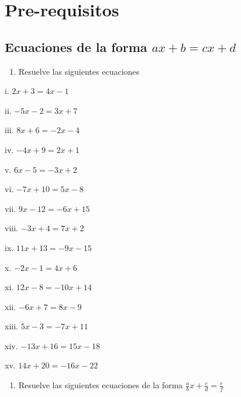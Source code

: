 \documentclass[]{book}
\providecommand{\tightlist}{%
  \setlength{\itemsep}{0pt}\setlength{\parskip}{0pt}}
\begin{document}
\chapter{Pre-requisitos}\label{pre-requisitos}

\section{\texorpdfstring{Ecuaciones de la forma
\(ax+b=cx+d\)}{Ecuaciones de la forma ax+b=cx+d}}\label{ecuaciones-de-la-forma-axbcxd}

\begin{enumerate}
\def\labelenumi{\arabic{enumi}.}
\tightlist
\item
  Resuelve las siguientes ecuaciones
\end{enumerate}

\begin{multicols}{2}
    i. $2x + 3 = 4x - 1$
    
    ii. $-5x - 2 = 3x + 7$

    iii. $8x + 6 = -2x - 4$

    iv. $-4x + 9 = 2x + 1$

    v. $6x - 5 = -3x + 2$

    vi. $-7x + 10 = 5x - 8$

    vii. $9x - 12 = -6x + 15$

    viii. $-3x + 4 = 7x + 2$

    ix. $11x + 13 = -9x - 15$

    x. $-2x - 1 = 4x + 6$

    xi. $12x - 8 = -10x + 14$

    xii.  $-6x + 7 = 8x - 9$

    xiii. $5x - 3 = -7x + 11$

    xiv. $-13x + 16 = 15x - 18$

    xv. $14x + 20 = -16x - 22$
\end{multicols}

\begin{enumerate}
\def\labelenumi{\arabic{enumi}.}
\setcounter{enumi}{1}
\tightlist
\item
  Resuelve las siguientes ecuaciones de la forma
  \(\frac{a}{b}x+\frac{c}{d}=\frac{e}{f}\)
\end{enumerate}
\end{document}
